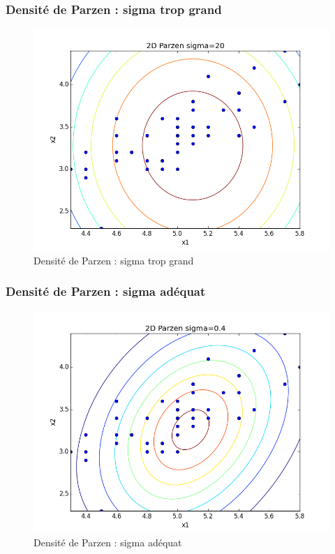 \documentclass[a4paper,10pt]{article}
\begin{document}
\subsubsection{Densité de Parzen : sigma trop grand}
\begin{figure}[H]
	\includegraphics[width=12cm]{images/2D_Parzen_sigma_grand.png} 
	\centering
	\caption{Densité de Parzen : sigma trop grand}
	\label{fig:comp}
\end{figure}

\subsubsection{Densité de Parzen : sigma adéquat}
\begin{figure}[H]
	\includegraphics[width=12cm]{images/2D_Parzen_sigma_ad.png} 
	\centering
	\caption{Densité de Parzen : sigma adéquat}
	\label{fig:comp}
\end{figure}
\end{document}
